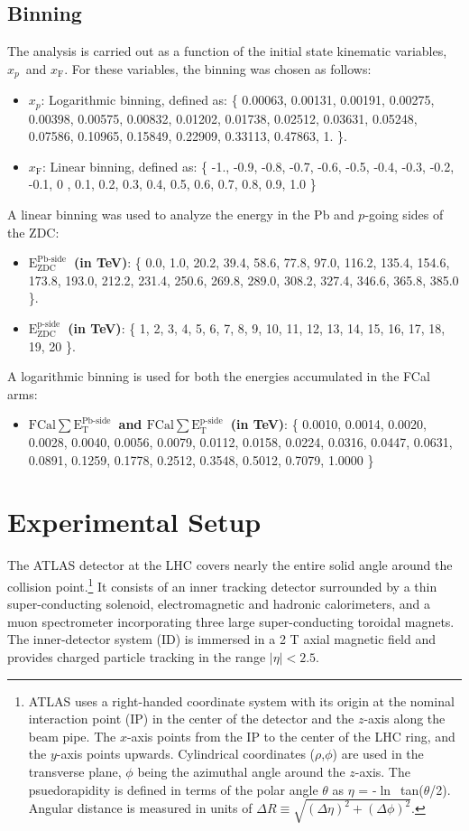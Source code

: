 \documentclass[NOTE, atlasdraft=true, texlive=2020, UKenglish]{atlasdoc}
\newcommand{\EZDC}{$\text{E}_\text{ZDC}^\text{Pb-side}$}
\newcommand{\EZDCp}{$\text{E}_\text{ZDC}^\text{p-side}$}
\newcommand{\ETPB}{$\text{FCal} \sum \text{E}_{\text{T}}^{\text{Pb-side} }$}
\newcommand{\ETP}{$\text{FCal} \sum \text{E}_{\text{T}}^{\text{p-side} }$}
\newcommand{\xp}{$x_{p}$}
\newcommand{\xf}{$x_{\text{F}}$}
\begin{document}
\subsection{Binning}
\label{sec:binning}
The analysis is carried out as a function of the initial state kinematic variables, \xp\ and \xf.  For these variables, the binning was chosen as follows: 
\begin{itemize}
    \item \textbf{\xp}: Logarithmic binning, defined as: \{ 0.00063, 0.00131, 0.00191, 0.00275, 0.00398, 0.00575, 0.00832, 0.01202, 0.01738, 0.02512, 0.03631, 0.05248, 0.07586, 0.10965, 0.15849, 0.22909, 0.33113, 0.47863, 1. \}.
    \item \textbf{\xf}: Linear binning, defined as: \{ -1., -0.9, -0.8, -0.7, -0.6, -0.5, -0.4, -0.3, -0.2, -0.1, 0 , 0.1, 0.2, 0.3, 0.4, 0.5, 0.6, 0.7, 0.8, 0.9, 1.0 \}
\end{itemize}
A linear binning was used to analyze the energy in the Pb and $p$-going sides of the ZDC:
\begin{itemize}
\item \textbf{\EZDC\ (in TeV)}: \{ 0.0, 1.0, 20.2, 39.4, 58.6, 77.8, 97.0, 116.2, 135.4, 154.6, 173.8, 193.0, 212.2, 231.4, 250.6, 269.8, 289.0, 308.2, 327.4, 346.6, 365.8, 385.0 \}. 
\item \textbf{\EZDCp\ (in TeV)}: \{ 1, 2, 3, 4, 5, 6, 7, 8, 9, 10, 11, 12, 13, 14, 15, 16, 17, 18, 19, 20 \}. 
\end{itemize}
A logarithmic binning is used for both the energies accumulated in the FCal arms:
\begin{itemize}
\item \textbf{\ETPB\ and \ETP\ (in TeV)}: \{ 0.0010, 0.0014, 0.0020, 0.0028, 0.0040, 0.0056, 0.0079, 0.0112, 0.0158, 0.0224, 0.0316, 0.0447, 0.0631, 0.0891, 0.1259, 0.1778, 0.2512, 0.3548, 0.5012, 0.7079, 1.0000 \} 
\end{itemize}\clearpage{}
\clearpage{}\section{Experimental Setup}
\label{sec:setup}
The ATLAS detector \cite{ATLAS_Collaboration_2008} at the LHC covers nearly the entire solid angle around the collision point.\footnote{ATLAS uses a right-handed coordinate system with its origin at the nominal interaction point (IP) in the center of the detector and the $z$-axis along the beam pipe. The $x$-axis points from the IP to the center of the LHC ring, and the $y$-axis points upwards. Cylindrical coordinates ($\rho$,$\phi$) are used in the transverse plane, $\phi$ being the azimuthal angle around the $z$-axis. The psuedorapidity is defined in terms of the polar angle $\theta$ as $\eta$ = -$\ln$~tan($\theta$/2). Angular distance is measured in units of $\Delta R\equiv \sqrt{ (\Delta \eta)^2 + (\Delta \phi)^2 } $.} It consists of an inner tracking detector surrounded by a thin super-conducting solenoid, electromagnetic and hadronic calorimeters, and a muon spectrometer incorporating three large super-conducting toroidal magnets. The inner-detector system (ID) is immersed in a 2 T axial magnetic field and provides charged particle tracking in the range $|\eta|<2.5$.
\end{document}

